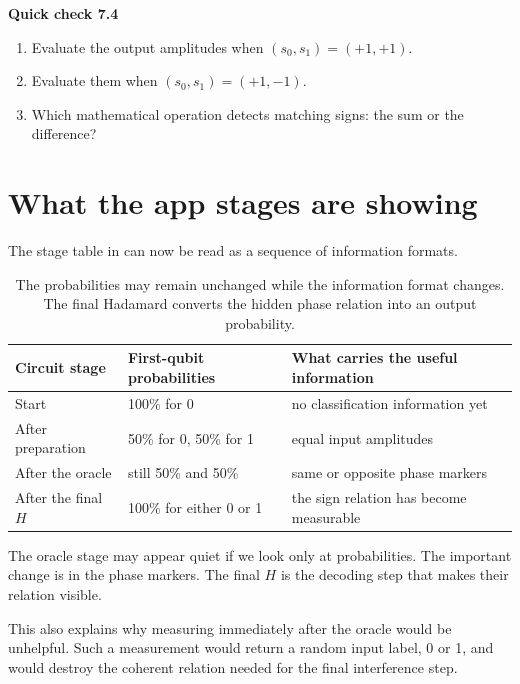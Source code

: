 \begin{checkpoint}
\textbf{Quick check 7.4}
\begin{enumerate}
  \item Evaluate the output amplitudes when $(s_0,s_1)=(+1,+1)$.
  \item Evaluate them when $(s_0,s_1)=(+1,-1)$.
  \item Which mathematical operation detects matching signs: the sum or the difference?
\end{enumerate}
\end{checkpoint}

\section{What the app stages are showing}
\label{sec:ch07-app-stages}

The stage table in  can now be read as a sequence of information formats.

\begin{table}[t]
\centering
\begin{tabular}{p{}p{}p{}}
\toprule
Circuit stage & First-qubit probabilities & What carries the useful information \\
\midrule
Start & 100\% for 0 & no classification information yet \\
After preparation & 50\% for 0, 50\% for 1 & equal input amplitudes \\
After the oracle & still 50\% and 50\% & same or opposite phase markers \\
After the final $H$ & 100\% for either 0 or 1 & the sign relation has become measurable \\
\bottomrule
\end{tabular}
\caption{The probabilities may remain unchanged while the information format changes. The final Hadamard converts the hidden phase relation into an output probability.}
\label{tab:ch07-app-stages}
\end{table}

The oracle stage may appear quiet if we look only at probabilities. The important change is in the phase markers. The final $H$ is the decoding step that makes their relation visible.

This also explains why measuring immediately after the oracle would be unhelpful. Such a measurement would return a random input label, 0 or 1, and would destroy the coherent relation needed for the final interference step.

